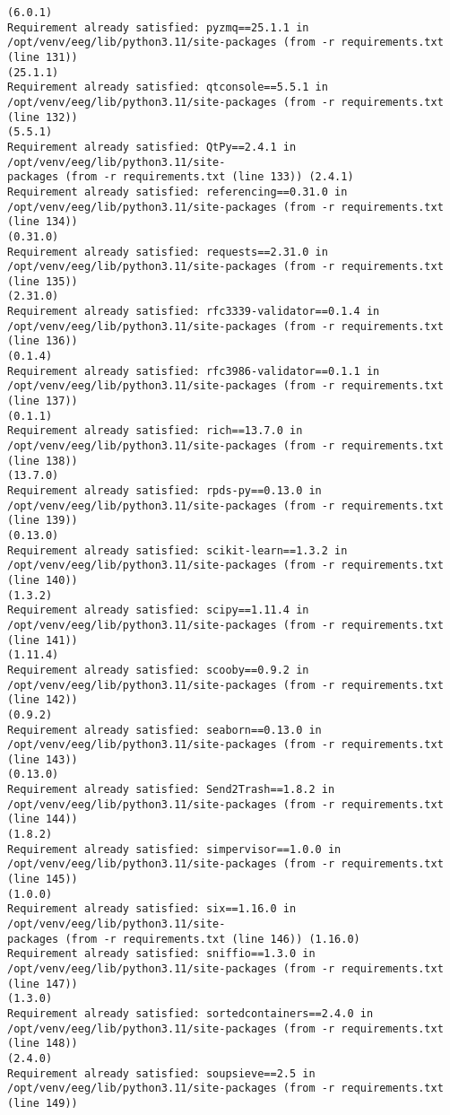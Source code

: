 \documentclass[11pt]{article}
\begin{document}
\begin{Verbatim}[commandchars=\\\{\}]
(6.0.1)
Requirement already satisfied: pyzmq==25.1.1 in
/opt/venv/eeg/lib/python3.11/site-packages (from -r requirements.txt (line 131))
(25.1.1)
Requirement already satisfied: qtconsole==5.5.1 in
/opt/venv/eeg/lib/python3.11/site-packages (from -r requirements.txt (line 132))
(5.5.1)
Requirement already satisfied: QtPy==2.4.1 in /opt/venv/eeg/lib/python3.11/site-
packages (from -r requirements.txt (line 133)) (2.4.1)
Requirement already satisfied: referencing==0.31.0 in
/opt/venv/eeg/lib/python3.11/site-packages (from -r requirements.txt (line 134))
(0.31.0)
Requirement already satisfied: requests==2.31.0 in
/opt/venv/eeg/lib/python3.11/site-packages (from -r requirements.txt (line 135))
(2.31.0)
Requirement already satisfied: rfc3339-validator==0.1.4 in
/opt/venv/eeg/lib/python3.11/site-packages (from -r requirements.txt (line 136))
(0.1.4)
Requirement already satisfied: rfc3986-validator==0.1.1 in
/opt/venv/eeg/lib/python3.11/site-packages (from -r requirements.txt (line 137))
(0.1.1)
Requirement already satisfied: rich==13.7.0 in
/opt/venv/eeg/lib/python3.11/site-packages (from -r requirements.txt (line 138))
(13.7.0)
Requirement already satisfied: rpds-py==0.13.0 in
/opt/venv/eeg/lib/python3.11/site-packages (from -r requirements.txt (line 139))
(0.13.0)
Requirement already satisfied: scikit-learn==1.3.2 in
/opt/venv/eeg/lib/python3.11/site-packages (from -r requirements.txt (line 140))
(1.3.2)
Requirement already satisfied: scipy==1.11.4 in
/opt/venv/eeg/lib/python3.11/site-packages (from -r requirements.txt (line 141))
(1.11.4)
Requirement already satisfied: scooby==0.9.2 in
/opt/venv/eeg/lib/python3.11/site-packages (from -r requirements.txt (line 142))
(0.9.2)
Requirement already satisfied: seaborn==0.13.0 in
/opt/venv/eeg/lib/python3.11/site-packages (from -r requirements.txt (line 143))
(0.13.0)
Requirement already satisfied: Send2Trash==1.8.2 in
/opt/venv/eeg/lib/python3.11/site-packages (from -r requirements.txt (line 144))
(1.8.2)
Requirement already satisfied: simpervisor==1.0.0 in
/opt/venv/eeg/lib/python3.11/site-packages (from -r requirements.txt (line 145))
(1.0.0)
Requirement already satisfied: six==1.16.0 in /opt/venv/eeg/lib/python3.11/site-
packages (from -r requirements.txt (line 146)) (1.16.0)
Requirement already satisfied: sniffio==1.3.0 in
/opt/venv/eeg/lib/python3.11/site-packages (from -r requirements.txt (line 147))
(1.3.0)
Requirement already satisfied: sortedcontainers==2.4.0 in
/opt/venv/eeg/lib/python3.11/site-packages (from -r requirements.txt (line 148))
(2.4.0)
Requirement already satisfied: soupsieve==2.5 in
/opt/venv/eeg/lib/python3.11/site-packages (from -r requirements.txt (line 149))

\end{Verbatim}
\end{document}
